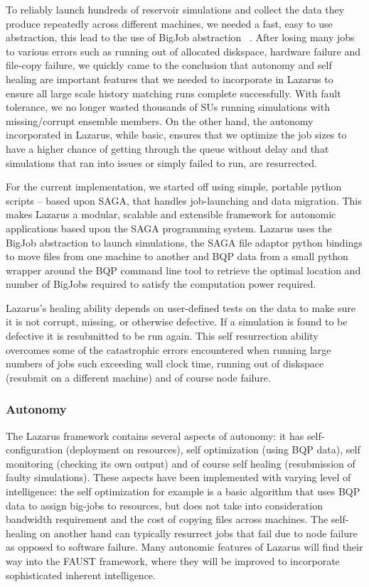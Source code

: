 \documentclass[conference,final]{IEEEtran}
\begin{document}
To reliably launch hundreds of reservoir simulations and collect the data
they produce repeatedly across different machines,
we needed a fast, easy to use abstraction, this lead to the use
of BigJob abstraction ~\cite{ICCS_paper, saga_royalsoc}.
After losing many jobs to various errors
such as running out of allocated diskspace, hardware failure
and file-copy failure, we quickly came to the conclusion that autonomy
and self healing are important features that we needed to incorporate 
in Lazarus to ensure all large scale history matching runs
complete successfully. With fault tolerance, we no longer wasted
thousands of SUs running simulations with missing/corrupt ensemble members.
On the other hand, the autonomy incorporated in Lazarus, while basic,
ensures that we optimize the job sizes to have a higher chance of getting
through the queue without delay and that simulations
that ran into issues or simply failed to run, are resurrected.

For the current implementation, we started off using simple, portable
python scripts -- based upon SAGA, that handles job-launching and data
migration. This makes Lazarus a modular,
scalable and extensible framework for autonomic applications based upon
the SAGA programming system.  Lazarus uses the BigJob
abstraction to launch simulations,
the SAGA file adaptor python bindings to move files from one machine
to another and BQP data from a small python wrapper around the BQP command line tool
to retrieve the optimal location and number of BigJobs required to satisfy the
computation power required.

Lazarus's healing ability depends on
user-defined tests on the data to make sure it
is not corrupt, missing, or otherwise defective. If a simulation is
found to be defective it is resubmitted to be run again. This self
resurrection ability overcomes some of the catastrophic errors
encountered when running large numbers of jobs such exceeding wall
clock time, running out of diskspace (resubmit on a different machine)
and of course node failure.

\subsubsection{Autonomy}
The Lazarus framework contains several aspects of autonomy: it has
self-configuration (deployment on resources), self optimization (using
BQP data), self monitoring (checking its own output) and of course
self healing (resubmission of faulty simulations). These aspects have
been implemented with varying level of intelligence: the self
optimization for example is a basic algorithm that uses BQP data to
assign big-jobs to resources, but does not take into consideration
bandwidth requirement and the cost of copying files across
machines. The self-healing on another hand can typically resurrect
jobs that fail due to node failure as opposed to software
failure. Many autonomic features of Lazarus will find their way into
the FAUST framework, where they will be improved to incorporate
sophisticated inherent intelligence.  
\end{document}
